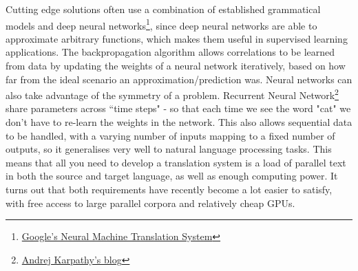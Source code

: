 \documentclass[]{article}
\begin{document}
Cutting edge solutions often use a combination of established grammatical models and deep neural networks\footnote{\href{https://arxiv.org/pdf/1406.1078.pdf}{Google's Neural Machine Translation System}}, since deep neural networks are able to approximate arbitrary functions, which makes them useful in supervised learning applications. The backpropagation algorithm allows correlations to be learned from data by updating the weights of a neural network iteratively, based on how far from the ideal scenario an approximation/prediction was. Neural networks can also take advantage of the symmetry of a problem. Recurrent Neural Network\footnote{\href{http://karpathy.github.io/2015/05/21/rnn-effectiveness/}{Andrej Karpathy's blog}} share parameters across ``time steps" - so that each time we see the word "cat" we don't have to re-learn the weights in the network. This also allows sequential data to be handled, with a varying number of inputs mapping to a fixed number of outputs, so it generalises very well to natural language processing tasks. This means that all you need to develop a translation system is a load of parallel text in both the source and target language, as well as enough computing power. It turns out that both requirements have recently become a lot easier to satisfy, with free access to large parallel corpora and relatively cheap GPUs.
\end{document}
